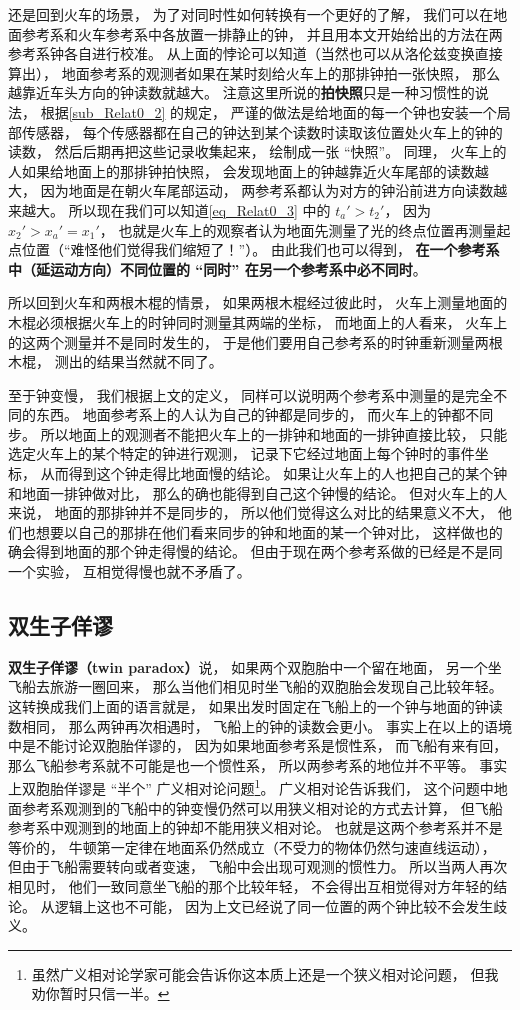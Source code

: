 还是回到火车的场景， 为了对同时性如何转换有一个更好的了解， 我们可以在地面参考系和火车参考系中各放置一排静止的钟， 并且用本文开始给出的方法在两参考系钟各自进行校准。 从上面的悖论可以知道（当然也可以从洛伦兹变换直接算出）， 地面参考系的观测者如果在某时刻给火车上的那排钟拍一张快照， 那么越靠近车头方向的钟读数就越大。 注意这里所说的\textbf{拍快照}只是一种习惯性的说法， 根据\autoref{sub_Relat0_2} 的规定， 严谨的做法是给地面的每一个钟也安装一个局部传感器， 每个传感器都在自己的钟达到某个读数时读取该位置处火车上的钟的读数， 然后后期再把这些记录收集起来， 绘制成一张 “快照”。 同理， 火车上的人如果给地面上的那排钟拍快照， 会发现地面上的钟越靠近火车尾部的读数越大， 因为地面是在朝火车尾部运动， 两参考系都认为对方的钟沿前进方向读数越来越大。 所以现在我们可以知道\autoref{eq_Relat0_3} 中的 $t_a' > t_2'$， 因为 $x_2' > x_a' = x_1'$， 也就是火车上的观察者认为地面先测量了光的终点位置再测量起点位置（“难怪他们觉得我们缩短了！”）。 由此我们也可以得到， \textbf{在一个参考系中（延运动方向）不同位置的 “同时” 在另一个参考系中必不同时}。

所以回到火车和两根木棍的情景， 如果两根木棍经过彼此时， 火车上测量地面的木棍必须根据火车上的时钟同时测量其两端的坐标， 而地面上的人看来， 火车上的这两个测量并不是同时发生的， 于是他们要用自己参考系的时钟重新测量两根木棍， 测出的结果当然就不同了。

至于钟变慢， 我们根据上文的定义， 同样可以说明两个参考系中测量的是完全不同的东西。 地面参考系上的人认为自己的钟都是同步的， 而火车上的钟都不同步。 所以地面上的观测者不能把火车上的一排钟和地面的一排钟直接比较， 只能选定火车上的某个特定的钟进行观测， 记录下它经过地面上每个钟时的事件坐标， 从而得到这个钟走得比地面慢的结论。 如果让火车上的人也把自己的某个钟和地面一排钟做对比， 那么的确也能得到自己这个钟慢的结论。 但对火车上的人来说， 地面的那排钟并不是同步的， 所以他们觉得这么对比的结果意义不大， 他们也想要以自己的那排在他们看来同步的钟和地面的某一个钟对比， 这样做也的确会得到地面的那个钟走得慢的结论。 但由于现在两个参考系做的已经是不是同一个实验， 互相觉得慢也就不矛盾了。

\subsection{双生子佯谬}
\textbf{双生子佯谬（twin paradox）}说， 如果两个双胞胎中一个留在地面， 另一个坐飞船去旅游一圈回来， 那么当他们相见时坐飞船的双胞胎会发现自己比较年轻。 这转换成我们上面的语言就是， 如果出发时固定在飞船上的一个钟与地面的钟读数相同， 那么两钟再次相遇时， 飞船上的钟的读数会更小。 事实上在以上的语境中是不能讨论双胞胎佯谬的， 因为如果地面参考系是惯性系， 而飞船有来有回， 那么飞船参考系就不可能是也一个惯性系， 所以两参考系的地位并不平等。 事实上双胞胎佯谬是 “半个” 广义相对论问题\footnote{虽然广义相对论学家可能会告诉你这本质上还是一个狭义相对论问题， 但我劝你暂时只信一半。}。 广义相对论告诉我们， 这个问题中地面参考系观测到的飞船中的钟变慢仍然可以用狭义相对论的方式去计算， 但飞船参考系中观测到的地面上的钟却不能用狭义相对论。 也就是这两个参考系并不是等价的， 牛顿第一定律在地面系仍然成立（不受力的物体仍然匀速直线运动）， 但由于飞船需要转向或者变速， 飞船中会出现可观测的惯性力。 所以当两人再次相见时， 他们一致同意坐飞船的那个比较年轻， 不会得出互相觉得对方年轻的结论。 从逻辑上这也不可能， 因为上文已经说了同一位置的两个钟比较不会发生歧义。

